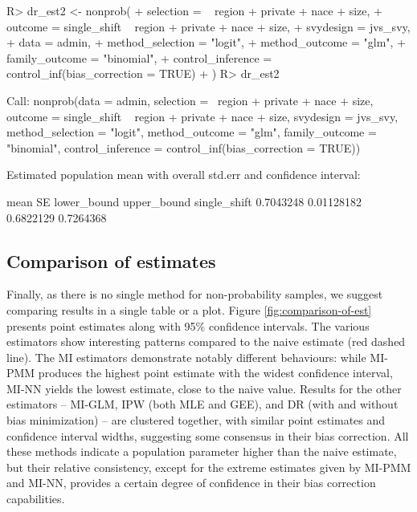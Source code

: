 \documentclass[
]{jss}
\begin{document}
\begin{CodeChunk}
\begin{CodeInput}
R> dr_est2 <- nonprob(
+   selection = ~ region + private + nace + size,
+   outcome = single_shift ~ region + private + nace + size,
+   svydesign = jvs_svy,
+   data = admin,
+   method_selection = "logit",
+   method_outcome = "glm",
+   family_outcome = "binomial",
+   control_inference = control_inf(bias_correction = TRUE)
+ )
R> dr_est2
\end{CodeInput}
\begin{CodeOutput}

Call:
nonprob(data = admin, selection = ~region + private + nace + 
    size, outcome = single_shift ~ region + private + nace + 
    size, svydesign = jvs_svy, method_selection = "logit", method_outcome = "glm", 
    family_outcome = "binomial", control_inference = control_inf(bias_correction = TRUE))

Estimated population mean with overall std.err and confidence interval:

                  mean         SE lower_bound upper_bound
single_shift 0.7043248 0.01128182   0.6822129   0.7264368
\end{CodeOutput}
\end{CodeChunk}

\subsection{Comparison of estimates}\label{comparison-of-estimates}

Finally, as there is no single method for non-probability samples, we
suggest comparing results in a single table or a plot. Figure
\ref{fig:comparison-of-est} presents point estimates along with 95\%
confidence intervals. The various estimators show interesting patterns
compared to the naive estimate (red dashed line). The MI estimators
demonstrate notably different behaviours: while MI-PMM produces the
highest point estimate with the widest confidence interval, MI-NN yields
the lowest estimate, close to the naive value. Results for the other
estimators -- MI-GLM, IPW (both MLE and GEE), and DR (with and without
bias minimization) -- are clustered together, with similar point
estimates and confidence interval widths, suggesting some consensus in
their bias correction. All these methods indicate a population parameter
higher than the naive estimate, but their relative consistency, except
for the extreme estimates given by MI-PMM and MI-NN, provides a certain
degree of confidence in their bias correction capabilities.
\end{document}
